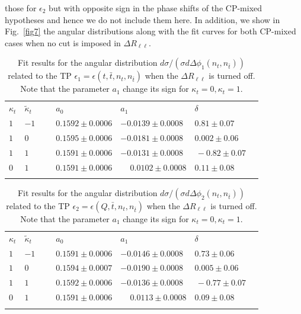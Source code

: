 \documentclass[aps,preprint,tightenlines,floatfix,superscriptaddress,nofootinbib,showpacs]{revtex4-1}
\def\tbar{\bar{t}}
\def\kp{\kappa_t}
\begin{document}
those for $\epsilon_2$ but with opposite sign in the phase shifts of
the $\mathrm{CP}$-mixed hypotheses and hence we do not include them
here. In addition, we show in Fig.~\ref{fig7} the angular
distributions along with the fit curves for both $\mathrm{CP}$-mixed
cases when no cut is imposed in $\Delta R_{\ell\ell}$.
\renewcommand{\arraystretch}{1.2}
\begin{table}[H]
\caption{Fit results for the angular distribution $d\sigma/(\sigma
  d\Delta\phi_1(n_t,n_{\tbar}))$ related to the TP
  $\epsilon_1=\epsilon(t,\tbar,n_t,n_{\tbar})$ when the $\Delta
  R_{\ell\ell}$ is turned off. Note that the parameter $a_1$ change
  its sign for $\kp=0,\kp=1$.}
\label{table3}
\begin{center}
\begin{tabular}{|C{1cm}|C{1cm}||C{3cm}|C{3cm}|C{3cm}|}
\hhline{|=====|}
$\kappa_t$&$\tilde{\kappa}_t$~~&$a_0$~~&$a_1$& $\delta$~~ \\ 
\hhline{|=====|} 
$1$ & $-1$~~~ & $0.1592 \pm 0.0006$ & $-0.0139 \pm 0.0008$ & $0.81 \pm 0.07$ \\[0.6mm]
\hline
$1$ & $0$ & $0.1595 \pm 0.0006$ & $-0.0181 \pm 0.0008$ & $0.002 \pm 0.06\,\,$ \\[0.6mm]
\hline
$1$ & $1$ & $0.1591 \pm 0.0006$ & $-0.0131 \pm 0.0008 $ & $\,-0.82 \pm 0.07\quad$  \\[0.6mm]
\hline
$0$ & $1$ & $0.1591 \pm 0.0006$ & ~~$\,0.0102 \pm 0.0008$ & $0.11 \pm 0.08$ \\
\hhline{|=====|}
\end{tabular}
\end{center} 
\end{table}
\begin{table}[H]
\caption{Fit results for the angular distribution $d\sigma/(\sigma
  d\Delta\phi_2(n_t,n_{\tbar}))$ related to the TP
  $\epsilon_2=\epsilon(Q,\tbar,n_t,n_{\tbar})$ when the $\Delta
  R_{\ell\ell}$ is turned off. Note that the parameter $a_1$ change
  its sign for $\kp=0,\kp=1$.}
\label{table4}
\begin{center}
\begin{tabular}{|C{1cm}|C{1cm}||C{3cm}|C{3cm}|C{3cm}|}
\hhline{|=====|}
$\kappa_t$&$\tilde{\kappa}_t$~~&$a_0$~~&$a_1$& $\delta$~~ \\ 
\hhline{|=====|} 
$1$ & $-1$~~~ & $0.1591 \pm 0.0006$ & $-0.0146 \pm 0.0008$ & $0.73 \pm 0.06$ \\[0.6mm]
\hline
$1$ & $0$ & $0.1594 \pm 0.0007$ & $-0.0190 \pm 0.0008$ & $0.005 \pm 0.06\,\,$ \\[0.6mm]
\hline
$1$ & $1$ & $0.1592 \pm 0.0006$ & $-0.0136 \pm 0.0008 $ & $\,-0.77 \pm 0.07\quad$  \\[0.6mm]
\hline
$0$ & $1$ & $0.1591 \pm 0.0006$ & ~~$\,0.0113 \pm 0.0008$ & $0.09 \pm 0.08$ \\
\hhline{|=====|}
\end{tabular}
\end{center} 
\end{table}
\end{document}
